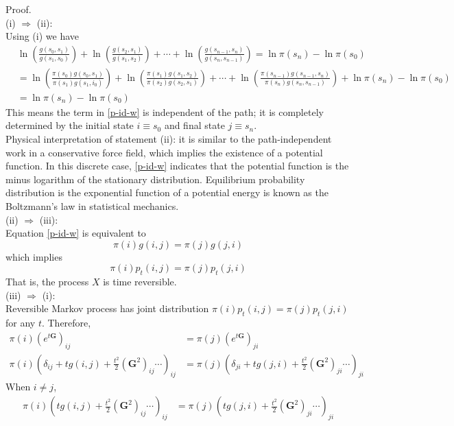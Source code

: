 \documentclass[12pt]{book}
\numberwithin{equation}{chapter}
\theoremstyle{plain}
\numberwithin{theorem}{section}
\theoremstyle{definition}
\numberwithin{exercise}{chapter}
\newcommand{\<}{\langle}
\renewcommand{\>}{\rangle}
\renewcommand{\(}{\left(}
\renewcommand{\)}{\right)}
\renewcommand{\[}{\left[}
\renewcommand{\]}{\right]}
\newcommand\Gv{\pmb{G}}
\begin{document}
Proof.\\
(i) $\Rightarrow$ (ii):\\
Using (i) we have
\begin{align}
& \ln\left( \frac{g(s_0, s_1)}{g(s_1, s_0)} \right) + \ln\left( \frac{g(s_2, s_1)}{g(s_1, s_2)} \right) + \cdots + \ln\left( \frac{g(s_{n-1}, s_n)}{g(s_n,  s_{n-1})} \right) = \ln \pi(s_n) - \ln \pi(s_0)\\
&= \ln\left( \frac{\pi(s_0) g(s_0, s_1)}{\pi(s_1) g(s_1 , i_0)} \right) + \ln\left( \frac{ \pi(s_1)  g(s_1, s_2)}{\pi(s_2) g(s_2, s_1)} \right) + \cdots + \ln\left( \frac{\pi(s_{n-1}) g(s_{n-1}, s_n)}{\pi(s_{n})g(s_n, s_{n-1})} \right) +\ln \pi(s_n) - \ln \pi(s_0) \label{p-id-w}\\
&= \ln\pi(s_n) - \ln\pi(s_0)
\end{align}
This means the term in \eqref{p-id-w} is independent of the path; it is completely determined by the initial state $i \equiv s_0$ and final state $j \equiv s_n$. \\
Physical interpretation of statement (ii): it is similar to the path-independent work in a conservative force field, which implies the existence of a potential function. In this discrete case, \eqref{p-id-w}  indicates that the potential function is the minus logarithm of the stationary distribution. Equilibrium probability distribution is the exponential function of a potential energy is known as the Boltzmann's law in statistical mechanics.\\
(ii) $\Rightarrow$ (iii):\\
Equation \eqref{p-id-w} is equivalent to 
$$ \pi(i) g(i,j ) =   \pi(j) g(j,i)$$
which implies 
$$ \pi(i) p_t (i,j)  = \pi(j) p_t (j,i) $$
That is, the process $X$ is time reversible.\\
(iii) $\Rightarrow$ (i):\\
Reversible Markov process has joint distribution $\pi(i) p_t (i,j)  = \pi(j) p_t (j,i)$ for any $t$.
Therefore,
\begin{align}
\pi(i) \left(e^{t \Gv}  \right)_{ij} &= \pi(j) \left(e^{t \Gv}  \right)_{ji} \\
\pi(i) \left( \delta_{ij} + tg(i,j) + \frac{t^2}{2} ({\Gv}^2)_{ij} \cdots  \right)_{ij} &= \pi(j) \left( \delta_{ji} + t g(j,i) + \frac{t^2}{2} ({\Gv}^2)_{ji} \cdots \right)_{ji} 
\end{align}
When $i \neq j$,
\begin{align}
\pi(i) \left( t g(i,j) + \frac{t^2}{2} ({\Gv}^2)_{ij} \cdots  \right)_{ij} &= \pi(j) \left( t g(j,i) + \frac{t^2}{2} ({\Gv}^2)_{ji} \cdots \right)_{ji} 
\end{align}
\end{document}
